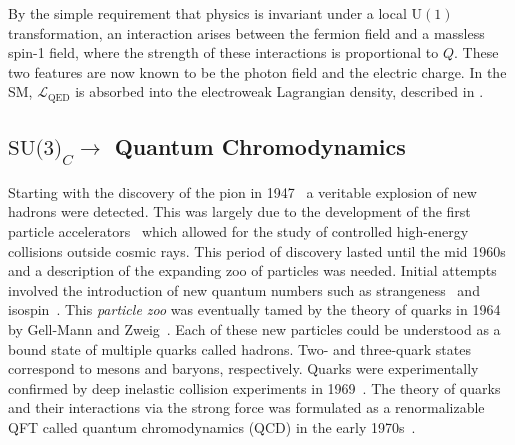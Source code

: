 By the simple requirement that physics is invariant under a local $\text{U}(1)$ transformation, an interaction arises between the fermion field and a massless spin-1 field, where the strength of these interactions is proportional to $Q$.
These two features are now known to be the photon field and the electric charge.
In the SM, $\mathcal{L}_\text{QED}$ is absorbed into the electroweak Lagrangian density, described in .

\subsection{\texorpdfstring{$\text{SU(3)}_C\rightarrow$}{SU(3)-} Quantum Chromodynamics}
\label{sec:qcd}

Starting with the discovery of the pion in 1947~\cite{DiscoveryPimeson} a veritable explosion of new hadrons were detected.
This was largely due to the development of the first particle accelerators~\cite{ProductionHighSpeed} which allowed for the study of controlled high-energy collisions outside cosmic rays.
This period of discovery lasted until the mid 1960s and a description of the expanding zoo of particles was needed.
Initial attempts involved the introduction of new quantum numbers such as strangeness~\cite{Strange2, Strange3} and isospin~\cite{StrongIso1, StrongIso2, StrongIso3,StrongIso4}.
This \textit{particle zoo} was eventually tamed by the theory of quarks in 1964 by Gell-Mann and Zweig~\cite{GellMan1964,Zweig1964}.
Each of these new particles could be understood as a bound state of multiple quarks called hadrons.
Two- and three-quark states correspond to mesons and baryons, respectively.
Quarks were experimentally confirmed by deep inelastic collision experiments in 1969~\cite{Quark1, Quark2}.
The theory of quarks and their interactions via the strong force was formulated as a renormalizable QFT called quantum chromodynamics (QCD) in the early 1970s~\cite{QCD1,QCD2,QCD3}.

